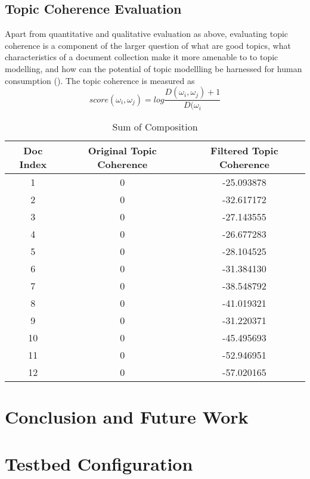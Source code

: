 \documentclass[11pt,twoside]{report}
\begin{document}
\section{Topic Coherence Evaluation}
Apart from quantitative and qualitative evaluation as above, evaluating topic coherence is a component of the larger question of what are good topics, what characteristics of a document collection make it more amenable to to topic modelling, and how can the potential of topic modellling be harnessed for human consumption (\cite{ref27}). The topic coherence is measured as
\begin{equation}
score(\omega_i, \omega_j) = log\frac{D(\omega_i, \omega_j) + 1}{D(\omega_i}
\end{equation}
\begin{table}[ht]
\caption{Sum of Composition}
\centering
\begin{tabular}{c c c}
\hline\hline
Doc Index & Original Topic Coherence & Filtered Topic Coherence\\
\hline
1 & 0 & -25.093878\\
2 & 0 & -32.617172\\
3 & 0 & -27.143555\\
4 & 0 & -26.677283\\
5 & 0 & -28.104525\\
6 & 0 & -31.384130\\
7 & 0 & -38.548792\\
8 & 0 & -41.019321\\
9 & 0 & -31.220371\\
10 & 0 & -45.495693\\
11 & 0 & -52.946951\\
12 & 0 & -57.020165\\
\hline
\end{tabular}
\label{table:Topic Coherence}
\end{table}


\chapter{Conclusion and Future Work}

\appendix
\chapter{Testbed Configuration}



\end{document}
